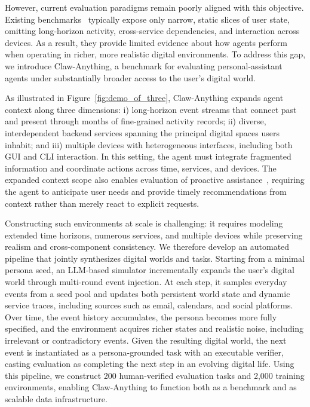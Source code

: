 \documentclass{article}
\begin{document}
However, current evaluation paradigms remain poorly aligned with this objective. Existing benchmarks~\citep{clawbench,wildclawbench,pinchbench,clawmark,qwenclawbench} typically expose only narrow, static slices of user state, omitting long-horizon activity, cross-service dependencies, and interaction across devices. As a result, they provide limited evidence about how agents perform when operating in richer, more realistic digital environments. To address this gap, we introduce Claw-Anything, a benchmark for evaluating personal-assistant agents under substantially broader access to the user's digital world.

As illustrated in Figure~\ref{fig:demo_of_three}, Claw-Anything expands agent context along three dimensions: i) long-horizon event streams that connect past and present through months of fine-grained activity records; ii) diverse, interdependent backend services spanning the principal digital spaces users inhabit; and iii) multiple devices with heterogeneous interfaces, including both GUI and CLI interaction. In this setting, the agent must integrate fragmented information and coordinate actions across time, services, and devices. The expanded context scope also enables evaluation of proactive assistance~\citep{ProAgentBench,yang2026contextagent}, requiring the agent to anticipate user needs and provide timely recommendations from context rather than merely react to explicit requests.

Constructing such environments at scale is challenging: it requires modeling extended time horizons, numerous services, and multiple devices while preserving realism and cross-component consistency. We therefore develop an automated pipeline that jointly synthesizes digital worlds and tasks. Starting from a minimal persona seed, an LLM-based simulator incrementally expands the user's digital world through multi-round event injection. At each step, it samples everyday events from a seed pool and updates both persistent world state and dynamic service traces, including sources such as email, calendars, and social platforms. Over time, the event history accumulates, the persona becomes more fully specified, and the environment acquires richer states and realistic noise, including irrelevant or contradictory events. Given the resulting digital world, the next event is instantiated as a persona-grounded task with an executable verifier, casting evaluation as completing the next step in an evolving digital life. Using this pipeline, we construct 200 human-verified evaluation tasks and 2,000 training environments, enabling Claw-Anything to function both as a benchmark and as scalable data infrastructure.
\end{document}
